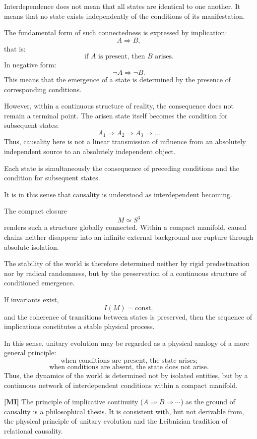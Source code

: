 \documentclass[12pt,a4paper]{article}
\theoremstyle{definition}
\begin{document}
Interdependence does not mean that all states are identical to one another. It means that no state exists independently of the conditions of its manifestation.

The fundamental form of such connectedness is expressed by implication:
\[
A\Rightarrow B,
\]
that is:
\[
\text{if } A \text{ is present, then } B \text{ arises.}
\]
In negative form:
\[
\neg A\Rightarrow \neg B.
\]
This means that the emergence of a state is determined by the presence of corresponding conditions.

However, within a continuous structure of reality, the consequence does not remain a terminal point. The arisen state itself becomes the condition for subsequent states:
\[
A_1\Rightarrow A_2\Rightarrow A_3\Rightarrow\dots
\]
Thus, causality here is not a linear transmission of influence from an absolutely independent source to an absolutely independent object.

Each state is simultaneously the consequence of preceding conditions and the condition for subsequent states.

It is in this sense that causality is understood as interdependent becoming.

The compact closure
\[
M\simeq S^3
\]
renders such a structure globally connected. Within a compact manifold, causal chains neither disappear into an infinite external background nor rupture through absolute isolation.

The stability of the world is therefore determined neither by rigid predestination nor by radical randomness, but by the preservation of a continuous structure of conditioned emergence.

If invariants exist,
\[
I(M)=\mathrm{const},
\]
and the coherence of transitions between states is preserved, then the sequence of implications constitutes a stable physical process.

In this sense, unitary evolution may be regarded as a physical analogy of a more general principle:
\[
\text{when conditions are present, the state arises;}
\]
\[
\text{when conditions are absent, the state does not arise.}
\]
Thus, the dynamics of the world is determined not by isolated entities, but by a continuous network of interdependent conditions within a compact manifold.

\medskip
\noindent\colorbox{clMeta}{\small\textbf{[MI]}} The principle of implicative continuity ($A\Rightarrow B\Rightarrow\cdots$) as the ground of causality is a philosophical thesis. It is consistent with, but not derivable from, the physical principle of unitary evolution \cite{Weinberg1995} and the Leibnizian tradition of relational causality.
\end{document}
